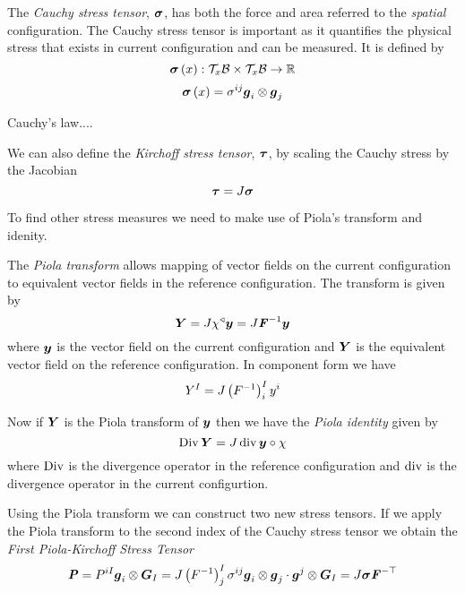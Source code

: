 The \emph{Cauchy stress tensor}, $\tensor{\sigma}$, has both the force and
area referred to the \emph{spatial} configuration. The Cauchy stress tensor is
important as it quantifies the physical stress that exists in current
configuration and can be measured. It is defined by
\begin{equation}
  \mapping{\fnof{\tensor{\sigma}}{x}}{\spaceprod{\tangentspace{\embedmanifold{B}}{x}}{\tangentspace{\embedmanifold{B}}{x}}}{\realnums}
\end{equation}
\ie
\begin{equation}
  \fnof{\tensor{\sigma}}{x}=\sigma^{ij}\tensorprod{\vectr{g}_{i}}{\vectr{g}_{j}}
\end{equation}

Cauchy's law....

We can also define the \emph{Kirchoff stress tensor}, $\tensor{\tau}$, by
scaling the Cauchy stress by the Jacobian \ie
\begin{equation}
  \tensor{\tau}=J\tensor{\sigma}
\end{equation}

To find other stress measures we need to make use of Piola's transform and
idenity.

The \emph{Piola transform} allows mapping of vector fields on the current
configuration to equivalent vector fields in the reference configuration. The
transform is given by
\begin{equation}
  \vectr{Y}=J\pullback{\chi}{\vectr{y}}=J\inverse{\tensor{F}}\vectr{y}
\end{equation}
where $\vectr{y}$ is the vector field on the current configuration and
$\vectr{Y}$ is the equivalent vector field on the reference configuration. In
component form we have
\begin{equation}
  Y^{I}=J\pbrac{\inverse{F}}^{I}_{i}y^{i}
\end{equation}

Now if $\vectr{Y}$ is the Piola transform of $\vectr{y}$ then we have the
\emph{Piola identity} given by
\begin{equation}
  \Divop{\vectr{Y}}=J\divop{\circcomposition{\vectr{y}}{\chi}}
\end{equation}
where $\Divop$ is the divergence operator in the reference configuration and
$\divop$ is the divergence operator in the current configurtion. 

Using the Piola transform we can construct two new stress tensors. If we apply
the Piola transform to the second index of the Cauchy stress tensor we obtain
the \emph{First Piola-Kirchoff Stress Tensor} \ie
\begin{equation}
  \tensor{P}=P^{iI}\tensorprod{\vectr{g}_{i}}{\vectr{G}_{I}}=J\pbrac{\inverse{F}}^{I}_{j}\sigma^{ij}\dotprod{\tensorprod{\vectr{g}_{i}}{\vectr{g}_{j}}}{\tensorprod{\vectr{g}^{j}}{\vectr{G}_{I}}}=J\tensor{\sigma}\invtranspose{\tensor{F}}
\end{equation}

